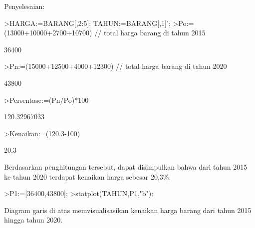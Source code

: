 \documentclass[a4paper,10pt]{article}
\begin{document}
\begin{eulernotebook}
\begin{eulercomment}
\begin{eulercomment}
\begin{eulercomment}
\begin{eulercomment}
\begin{eulercomment}
\begin{eulercomment}
\begin{eulercomment}
\begin{eulercomment}
\begin{eulercomment}
\begin{eulercomment}
\begin{eulercomment}
\begin{eulercomment}
\begin{eulercomment}
\begin{eulercomment}
\begin{eulercomment}
\begin{eulercomment}
\begin{eulercomment}
Penyelesaian:
\end{eulercomment}
\begin{eulerprompt}
>HARGA:=BARANG[,2:5]; TAHUN:=BARANG[,1]';
>Po:=(13000+10000+2700+10700) // total harga barang di tahun 2015
\end{eulerprompt}
\begin{euleroutput}
  36400
\end{euleroutput}
\begin{eulerprompt}
>Pn:=(15000+12500+4000+12300) // total harga barang di tahun 2020
\end{eulerprompt}
\begin{euleroutput}
  43800
\end{euleroutput}
\begin{eulerprompt}
>Persentase:=(Pn/Po)*100
\end{eulerprompt}
\begin{euleroutput}
  120.32967033
\end{euleroutput}
\begin{eulerprompt}
>Kenaikan:=(120.3-100)
\end{eulerprompt}
\begin{euleroutput}
  20.3
\end{euleroutput}
\begin{eulercomment}
Berdasarkan penghitungan tersebut, dapat disimpulkan bahwa dari tahun
2015 ke tahun 2020 terdapat kenaikan harga sebesar 20,3\%.
\end{eulercomment}
\begin{eulerprompt}
>P1:=[36400,43800];
>statplot(TAHUN,P1,"b"):
\end{eulerprompt}
\begin{eulercomment}
Diagram garis di atas memvisualisasikan kenaikan harga barang dari
tahun 2015 hingga tahun 2020.
\end{eulercomment}
\begin{eulercomment}


\end{eulercomment}
\end{eulercomment}
\end{eulercomment}
\end{eulercomment}
\end{eulercomment}
\end{eulercomment}
\end{eulercomment}
\end{eulercomment}
\end{eulercomment}
\end{eulercomment}
\end{eulercomment}
\end{eulercomment}
\end{eulercomment}
\end{eulercomment}
\end{eulercomment}
\end{eulercomment}
\end{eulercomment}
\end{eulernotebook}
\end{document}
